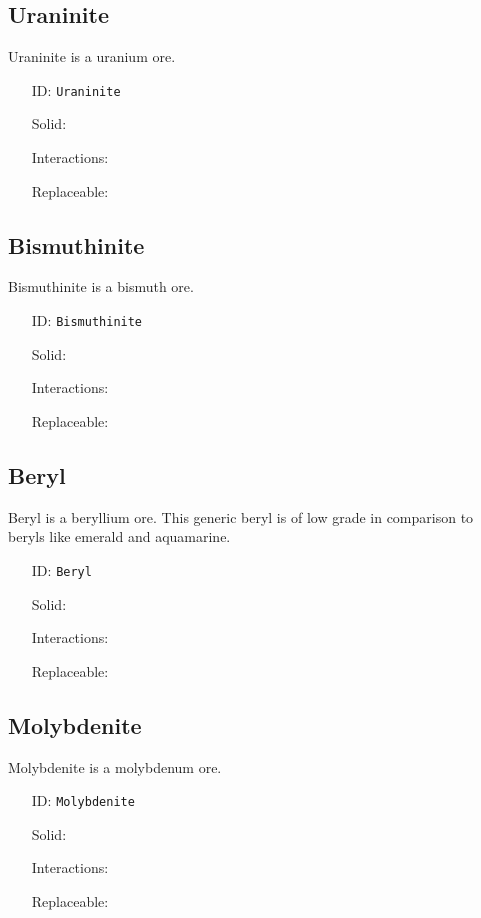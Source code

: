 \subsection{Uraninite}\label{subsec:blocks_uraninite}
Uraninite is a uranium ore.
\newline
\begin{itemize}[nosep]
\item[ID:] \texttt{Uraninite}
\item[Solid:]  \Checkmark \item[Interactions:]  \XSolidBrush \item[Replaceable:]  \XSolidBrush \end{itemize}

\subsection{Bismuthinite}\label{subsec:blocks_bismuthinite}
Bismuthinite is a bismuth ore.
\newline
\begin{itemize}[nosep]
\item[ID:] \texttt{Bismuthinite}
\item[Solid:]  \Checkmark \item[Interactions:]  \XSolidBrush \item[Replaceable:]  \XSolidBrush \end{itemize}

\subsection{Beryl}\label{subsec:blocks_beryl}
Beryl is a beryllium ore.
                This generic beryl is of low grade in comparison to beryls like emerald and aquamarine.
\newline
\begin{itemize}[nosep]
\item[ID:] \texttt{Beryl}
\item[Solid:]  \Checkmark \item[Interactions:]  \XSolidBrush \item[Replaceable:]  \XSolidBrush \end{itemize}

\subsection{Molybdenite}\label{subsec:blocks_molybdenite}
Molybdenite is a molybdenum ore.
\newline
\begin{itemize}[nosep]
\item[ID:] \texttt{Molybdenite}
\item[Solid:]  \Checkmark \item[Interactions:]  \XSolidBrush \item[Replaceable:]  \XSolidBrush \end{itemize}

